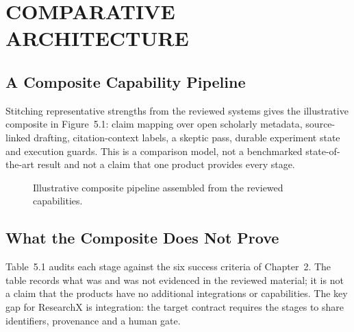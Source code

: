 \documentclass[12pt,a4paper]{report}
\numberwithin{equation}{chapter}
\begin{document}
\chapter{COMPARATIVE ARCHITECTURE}

\section{A Composite Capability Pipeline}
Stitching representative strengths from the reviewed systems gives the
illustrative composite in Figure~5.1: claim mapping over open scholarly
metadata, source-linked drafting, citation-context labels, a skeptic pass,
durable experiment state and execution guards. This is a comparison model,
not a benchmarked state-of-the-art result and not a claim that one product
provides every stage.

\begin{figure}[ht]
\centering
{}
\caption{Illustrative composite pipeline assembled from the reviewed capabilities.}
\end{figure}

\section{What the Composite Does Not Prove}
Table~5.1 audits each stage against the six success criteria of Chapter~2.
The table records what was and was not evidenced in the reviewed material;
it is not a claim that the products have no additional integrations or
capabilities. The key gap for ResearchX is integration: the target contract
requires the stages to share identifiers, provenance and a human gate.
\end{document}
